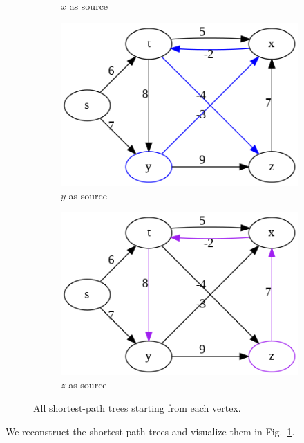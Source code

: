 \documentclass[../main.tex]{subfiles}
\begin{document}
\begin{figure}[!ht]
\begin{subfigure}{.32\textwidth}
    \caption{$x$ as source}
    \end{subfigure}
    

    \begin{subfigure}{.32\textwidth}
    \includegraphics[width=0.99\columnwidth]{fig/shortest_path_trees_3.png}
    \caption{$y$ as source}
    \end{subfigure}
    \begin{subfigure}{.32\textwidth}
    \includegraphics[width=0.99\columnwidth]{fig/shortest_path_trees_4.png}
    \caption{$z$ as source}
    \end{subfigure}
    \caption{All shortest-path trees starting from each vertex.}
    \label{fig:shortest_path_tree_all}
\end{figure}
We reconstruct the shortest-path trees and visualize them in Fig.~\ref{fig:shortest_path_tree_all}. 
\end{document}
